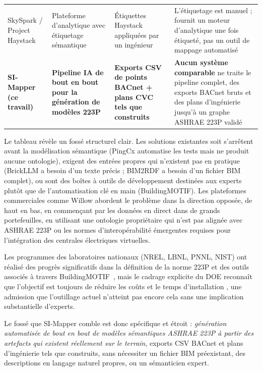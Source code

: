 \begin{table}[htbp]
\begin{tabular}{p{3cm}p{3cm}p{3cm}p{4cm}}
SkySpark / Project Haystack~\cite{SkySpark}
  & Plateforme d'analytique avec étiquetage sémantique
  & Étiquettes Haystack appliquées par un ingénieur
  & L'étiquetage est manuel ; fournit un moteur d'analytique une fois étiqueté, pas un outil de mappage automatisé \\
\addlinespace

\textbf{SI-Mapper (ce travail)}
  & \textbf{Pipeline IA de bout en bout pour la génération de modèles 223P}
  & \textbf{Exports CSV de points BACnet + plans CVC tels que construits}
  & \textbf{Aucun système comparable} ne traite le pipeline complet, des exports BACnet bruts et des plans d'ingénierie jusqu'à un graphe ASHRAE 223P validé \\

\bottomrule
\end{tabular}
\end{table}

Le tableau révèle un fossé structurel clair.
Les solutions existantes soit s'arrêtent avant la modélisation sémantique (PingCx automatise les tests mais ne produit aucune
ontologie), exigent des entrées propres qui n'existent pas en pratique (BrickLLM a besoin d'un texte précis ;
BIM2RDF a besoin d'un fichier BIM complet), ou sont des boîtes à outils de développement destinées aux experts plutôt que de
l'automatisation clé en main (BuildingMOTIF).
Les plateformes commerciales comme Willow abordent le problème dans la direction opposée, de haut en bas,
en commençant par les données en direct dans de grands portefeuilles, en utilisant une ontologie propriétaire qui n'est pas alignée avec
ASHRAE 223P ou les normes d'interopérabilité émergentes requises pour l'intégration des centrales électriques virtuelles.

Les programmes des laboratoires nationaux (NREL, LBNL, PNNL, NIST) ont réalisé des progrès significatifs dans la définition
de la norme 223P et des outils associés à travers BuildingMOTIF~\cite{BuildingMOTIF_NREL,DOE_BuildingMOTIF},
mais le cadrage explicite du DOE reconnaît que l'objectif est toujours de \og réduire les coûts et le temps d'installation \fg{},
une admission que l'outillage actuel n'atteint pas encore cela sans une implication substantielle d'experts.

Le fossé que SI-Mapper comble est donc spécifique et étroit :
\emph{génération automatisée de bout en bout de modèles sémantiques ASHRAE 223P à partir des artefacts qui
existent réellement sur le terrain}, exports CSV BACnet et plans d'ingénierie tels que construits, sans
nécessiter un fichier BIM préexistant, des descriptions en langage naturel propres, ou un sémanticien expert.

